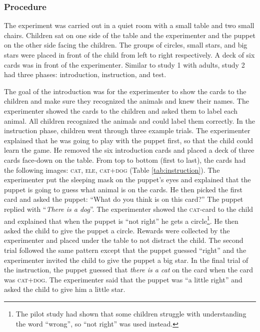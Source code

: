 \documentclass[,man,floatsintext]{apa6}
\let\rmarkdownfootnote\footnote%
\def\footnote{\protect\rmarkdownfootnote}
\begin{document}
\hypertarget{procedure-1}{%
\subsubsection{Procedure}\label{procedure-1}}

The experiment was carried out in a quiet room with a small table and two small chairs. Children sat on one side of the table and the experimenter and the puppet on the other side facing the children. The groups of circles, small stars, and big stars were placed in front of the child from left to right respectively. A deck of six cards was in front of the experimenter. Similar to study 1 with adults, study 2 had three phases: introduction, instruction, and test.

The goal of the introduction was for the experimenter to show the cards to the children and make sure they recognized the animals and knew their names. The experimenter showed the cards to the children and asked them to label each animal. All children recognized the animals and could label them correctly. In the instruction phase, children went through three example trials. The experimenter explained that he was going to play with the puppet first, so that the child could learn the game. He removed the six introduction cards and placed a deck of three cards face-down on the table. From top to bottom (first to last), the cards had the following images: \textsc{cat}, \textsc{ele}, \textsc{cat+dog} (Table \ref{tab:instruction}). The experimenter put the sleeping mask on the puppet's eyes and explained that the puppet is going to guess what animal is on the cards. He then picked the first card and asked the puppet: \enquote{What do you think is on this card?} The puppet replied with \enquote{\emph{There is a dog}}. The experimenter showed the \textsc{cat}-card to the child and explained that when the puppet is \enquote{not right} he gets a circle\footnote{The pilot study had shown that some children struggle with understanding the word \enquote{wrong}, so \enquote{not right} was used instead.}. He then asked the child to give the puppet a circle. Rewards were collected by the experimenter and placed under the table to not distract the child. The second trial followed the same pattern except that the puppet guessed \enquote{right} and the experimenter invited the child to give the puppet a big star. In the final trial of the instruction, the puppet guessed that \emph{there is a cat} on the card when the card was \textsc{cat+dog}. The experimenter said that the puppet was \enquote{a little right} and asked the child to give him a little star.
\end{document}
